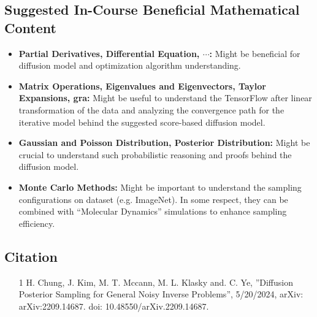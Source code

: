 \documentclass{article}
\begin{document}
\subsection*{Suggested In-Course Beneficial Mathematical Content}
\begin{itemize}
    \item \textbf{Partial Derivatives, Differential Equation, $\cdots$: } Might be beneficial for diffusion model and optimization algorithm understanding.
    \item \textbf{Matrix Operations, Eigenvalues and Eigenvectors, Taylor Expansions, gra: } Might be useful to understand the TensorFlow after linear transformation of the data and analyzing the convergence path for the iterative model behind the suggested score-based diffusion model.
    \item \textbf{Gaussian and Poisson Distribution, Posterior Distribution: } Might be crucial to understand such probabilistic reasoning and proofs behind the diffusion model.
    \item \textbf{Monte Carlo Methods: } Might be important to understand the sampling configurations on dataset (e.g. ImageNet). In some respect, they can be combined with ``Molecular Dynamics'' simulations to enhance sampling efficiency.
\end{itemize}

\subsection*{Citation}
\begin{enumerate}
    \item [1] H. Chung, J. Kim, M. T. Mccann, M. L. Klasky and. C. Ye, ''Diffusion Posterior Sampling for General Noisy Inverse Problems'', 5/20/2024, arXiv: arXiv:2209.14687. doi: 10.48550/arXiv.2209.14687.
\end{enumerate}
\end{document}
